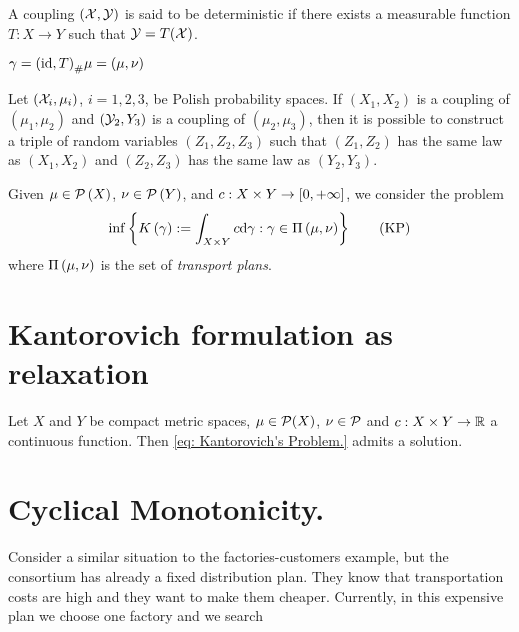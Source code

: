 \begin{definition}
A coupling $(\mathcal{X},\mathcal{Y})$ is said to be deterministic if there exists a measurable function $T: X \rightarrow Y$ such that $\mathcal{Y} = T(\mathcal{X})$.
\end{definition}

$\gamma={\left( \mathrm{id}, T \right)}_{\#} \mu=(\mu, \nu)$


\begin{lemma} Let $(\mathcal{X}_i , \mu_i)$, $i = 1, 2, 3$,  be Polish probability spaces. If $(X_1 , X_2)$ is a coupling of $(\mu_1, \mu_2 )$ and $(\mathcal{Y}_2 , Y_3)$ is a coupling of $(\mu_2, \mu_3)$, then it is possible to construct a triple of random variables $(Z_1 , Z_2, Z_3)$ such that $(Z_1, Z_2)$ has the same law as $(X_1 , X_2)$ and $(Z_2, Z_3)$ has the same law as $(Y_2 , Y_3)$.
\end{lemma}


\begin{problem}Given $\mu \in \mathcal{P}\left( X \right)$, $\nu \in \mathcal{P}\left( Y \right)$, and $c: X\times Y \rightarrow \left[ 0, +\infty \right]$, we consider the problem
	\begin{equation}
		\inf\left\lbrace K\left(\gamma\right) := \int_{X\times Y} c \mathrm{d}\gamma : \gamma \in \Pi\left(\mu, \nu\right) \right\rbrace\label{eq: Kantorovich's Problem.}\tag{KP}
	\end{equation}
where $\Pi\left(\mu, \nu\right)$ is the set of \textit{transport plans}.
\end{problem}



\section{Kantorovich formulation as relaxation}

\begin{theorem}
	Let $X$ and $Y$ be compact metric spaces, $\mu \in \mathcal{P}(X)$, $\nu \in  \mathcal{P}$ and
	$c:X\times Y \rightarrow \mathbb{R}$  a continuous function. Then  \eqref{eq: Kantorovich's Problem.} admits a solution.
\end{theorem} 

\section{Cyclical Monotonicity.}

Consider a similar situation to the factories-customers example, but the consortium has already a fixed distribution plan. They know that transportation costs are high and they want to make them cheaper. Currently, in this expensive plan we choose one factory and we search  


